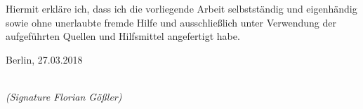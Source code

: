 \newpage

\thispagestyle{empty}

\begin{large}

\vspace*{6cm}

\noindent
Hiermit erkl\"are ich, dass ich die vorliegende Arbeit selbstst\"andig und eigenh\"andig sowie ohne unerlaubte fremde Hilfe und ausschlie\ss{}lich unter Verwendung der aufgef\"uhrten Quellen und Hilfsmittel angefertigt habe.
\vspace{2cm}

\noindent
Berlin, 27.03.2018

\vspace{3cm}

\hspace*{7cm}%
\dotfill\\
\hspace*{8.5cm}%
\textit{(Signature Florian G\"o\ss{}ler)}

\end{large}